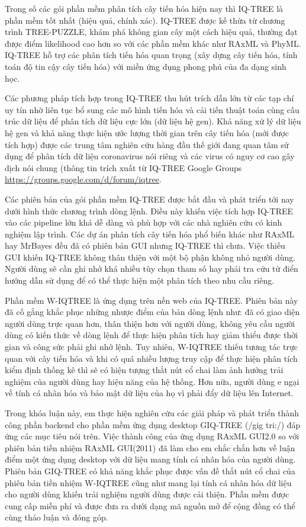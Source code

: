\documentclass[12pt]{report}
\begin{document}
Trong số các gói phần mềm phân tích cây tiến hóa hiện nay thì IQ-TREE là phần mềm tốt nhất (hiệu quả, chính xác). IQ-TREE được kế thừa từ chương trình TREE-PUZZLE\cite{cia-14}, khám phá không gian cây một cách hiệu quả, thường đạt được điểm likelihood cao hơn so với các phần mềm khác như RAxML và PhyML. IQ-TREE hỗ trợ các phân tích tiến hóa quan trọng (xây dựng cây tiến hóa, tính toán độ tin cậy cây tiến hóa) với miền ứng dụng phong phú của đa dạng sinh học. 

Các phương pháp tích hợp trong IQ-TREE thu hút trích dẫn lớn từ các tạp chí uy tín nhờ liên tục bổ sung các mô hình tiến hóa và cải tiến thuật toán cùng cấu trúc dữ liệu để phân tích dữ liệu cực lớn (dữ liệu hệ gen). Khả năng xử lý dữ liệu hệ gen và khả năng thực hiện ước lượng thời gian trên cây tiến hóa (mới được tích hợp) được các trung tâm nghiên cứu hàng đầu thế giới đang quan tâm sử dụng để phân tích dữ liệu coronavirus nói riêng và các virus có nguy cơ cao gây dịch nói chung (thông tin trích xuất từ IQ-TREE Google Groups \url{https://groups.google.com/d/forum/iqtree}.

Các phiên bản của gói phần mềm IQ-TREE được bắt đầu và phát triển tới nay dưới hình thức chương trình dòng lệnh. Điều này khiến việc tích hợp IQ-TREE vào các pipeline lớn khá dễ dàng và phù hợp với các nhà nghiên cứu có kinh nghiệm lập trình. Các dự án phân tích cây tiến hóa phổ biến khác như RAxML hay MrBayes đều đã có phiên bản GUI nhưng IQ-TREE thì chưa. Việc thiếu GUI khiến IQ-TREE không thân thiện với một bộ phận không nhỏ người dùng. Người dùng sẽ cần ghi nhớ khá nhiều tùy chọn tham số hay phải tra cứu từ điển hướng dẫn sử dụng để có thể thực hiện một phân tích theo nhu cầu riêng. 

Phần mềm W-IQTREE là ứng dụng trên nền web của IQ-TREE. Phiên bản này đã cố gắng khắc phục những nhược điểm của bản dòng lệnh như: đã có giao diện người dùng trực quan hơn, thân thiện hơn với người dùng, không yêu cầu người dùng có kiến thức về dòng lệnh để thực hiện phân tích hay giảm thiểu được thời gian và công sức phải ghi nhớ lệnh. Tuy nhiên, W-IQTREE thiếu tương tác trực quan với cây tiến hóa và khi có quá nhiều lượng truy cập để thực hiện phân tích kiểm định thống kê thì sẽ có hiện tượng thắt nút cổ chai làm ảnh hưởng trải nghiệm của người dùng hay hiệu năng của hệ thống. Hơn nữa, người dùng e ngại về tính cá nhân hóa và bảo mật dữ liệu của họ vì phải đẩy dữ liệu lên Internet.

Trong khóa luận này, em thực hiện nghiên cứu các giải pháp và phát triển thành công phần backend cho phần mềm ứng dụng desktop GIQ-TREE (/gig tri:/) đáp ứng các mục tiêu nói trên. Việc thành công của ứng dụng RAxML GUI2.0 so với phiên bản tiền nhiệm RAxML GUI(2011) đã làm cho em chắc chắn hơn về luận điểm một ứng dụng desktop với dữ liệu mang tính cá nhân hóa của người dùng. Phiên bản GIQ-TREE có khả năng khắc phục được vấn đề thắt nút cổ chai của phiên bản tiền nhiệm W-IQTREE cũng như mang lại tính cá nhân hóa dữ liệu cho người dùng khiến trải nghiệm người dùng được cải thiện. Phần mềm được cung cấp miễn phí và được đưa ra dưới dạng mã nguồn mở để cộng đồng có thể cùng thảo luận và đóng góp.
\end{document}
